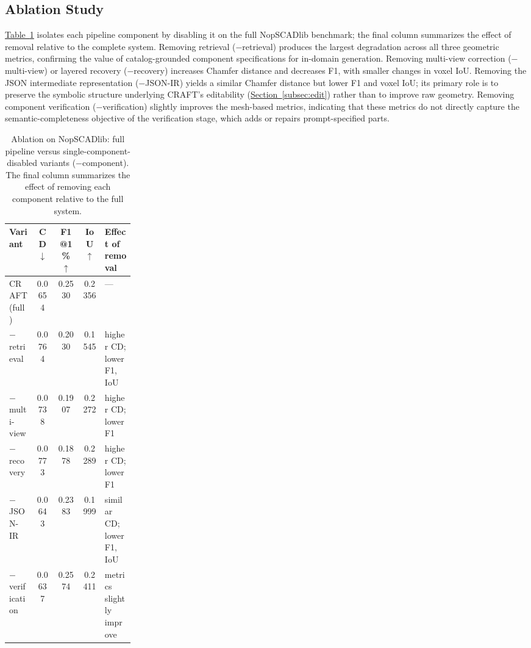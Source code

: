 \documentclass[conference]{IEEEtran}
\newcommand{\colref}[2]{\hyperref[#2]{#1~\ref*{#2}}}
\newcommand{\secref}[1]{\colref{Section}{#1}}
\newcommand{\tabref}[1]{\colref{Table}{#1}}
\begin{document}
\subsection{Ablation Study}
\label{subsec:ablation}

\tabref{tab:ablation} isolates each pipeline component by disabling it on the full NopSCADlib benchmark; the final column summarizes the effect of removal relative to the complete system. Removing retrieval ($-$retrieval) produces the largest degradation across all three geometric metrics, confirming the value of catalog-grounded component specifications for in-domain generation. Removing multi-view correction ($-$multi-view) or layered recovery ($-$recovery) increases Chamfer distance and decreases F1, with smaller changes in voxel IoU. Removing the JSON intermediate representation ($-$JSON-IR) yields a similar Chamfer distance but lower F1 and voxel IoU; its primary role is to preserve the symbolic structure underlying CRAFT's editability (\secref{subsec:edit}) rather than to improve raw geometry. Removing component verification ($-$verification) slightly improves the mesh-based metrics, indicating that these metrics do not directly capture the semantic-completeness objective of the verification stage, which adds or repairs prompt-specified parts.

\begin{table}[t]
\centering
\caption{Ablation on NopSCADlib: full pipeline versus single-component-disabled variants ($-$component). The final column summarizes the effect of removing each component relative to the full system.}
\label{tab:ablation}
\footnotesize
\setlength{\tabcolsep}{3pt}
\begin{tabular}{lcccp{0.24\linewidth}}
\toprule
Variant & CD$\downarrow$ & F1@1\%$\uparrow$ & IoU$\uparrow$ & Effect of removal \\
\midrule
CRAFT (full)      & 0.0654 & 0.2530 & 0.2356 & --- \\
$-$\,retrieval    & 0.0764 & 0.2030 & 0.1545 & higher CD; lower F1, IoU \\
$-$\,multi-view   & 0.0738 & 0.1907 & 0.2272 & higher CD; lower F1 \\
$-$\,recovery     & 0.0773 & 0.1878 & 0.2289 & higher CD; lower F1 \\
$-$\,JSON-IR      & 0.0643 & 0.2383 & 0.1999 & similar CD; lower F1, IoU \\
$-$\,verification & 0.0637 & 0.2574 & 0.2411 & metrics slightly improve \\
\bottomrule
\end{tabular}
\end{table}
\end{document}
